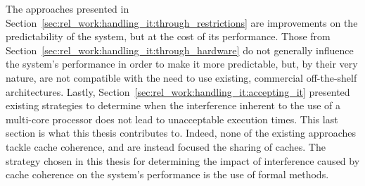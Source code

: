 The approaches presented in Section~\ref{sec:rel_work:handling_it:through_restrictions}
are improvements on the predictability of the system, but at the cost of its
performance. Those from Section~\ref{sec:rel_work:handling_it:through_hardware} do not
generally influence the system's performance in order to make it more
predictable, but, by their very nature, are not compatible with the need to use
existing, commercial off-the-shelf architectures. Lastly,
Section~\ref{sec:rel_work:handling_it:accepting_it} presented existing strategies to
determine when the interference inherent to the use of a multi-core processor
does not lead to unacceptable execution times. This last section is what this
thesis contributes to. Indeed, none of the existing approaches tackle cache
coherence, and are instead focused the sharing of caches. The strategy chosen in
this thesis for determining the impact of interference caused by cache coherence
on the system's performance is the use of formal methods.
